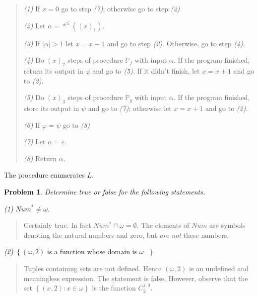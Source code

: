 \documentclass[a4paper, 12pt]{article}
\newtheorem{problem}{Problem}
\newtheorem{problem}{Problem}
\begin{document}
\begin{quote}
    \textit{(1)} If $x = 0$ go to step \textit{(7)}; otherwise go to step
    \textit{(2)}

    \textit{(2)} Let $\alpha = *^{\leq}\left( (x)_1 \right) $. 

    \textit{(3)} If $|\alpha| > 1$ let $x = x + 1$ and go to step \textit{(2)}.
    Otherwise, go to step \textit{(4)}. 

    \textit{(4)} Do $(x)_2$ steps of procedure $\mathbb{P}_f$ with input
    $\alpha$. If the program finished, return its output in $\varphi$ and go to
    \textit{(5)}. If it didn't finish, let $x = x + 1$ and go to \textit{(2)}.

    \textit{(5)} Do $(x)_3$ steps of procedure $\mathbb{P}_g$ with input
    $\alpha$. If the program finished, store its output in $\psi$ and go to
    \textit{(7)}; otherwise let
    $x = x + 1$ and go to \textit{(2)}.

    \textit{(6)} If $\varphi = \psi$ go to \textit{(8)}

    \textit{(7)} Let $\alpha = \varepsilon$. 

    \textit{(8)} Return $\alpha$.

\end{quote}

The procedure enumerates $L$.

\pagebreak 

\begin{problem}
    Determine true or false for the following statements.
\end{problem}

\textit{(1)} $Num^{*} \neq \omega$. 


\small
\begin{quote}

    Certainly true. In fact $Num^{*} \cap \omega = \emptyset$. The elements of
    $Num$ are symbols denoting the natural numbers and zero, but \textit{are
    not} these numbers.
\end{quote}
\normalsize


\textit{(2)} $\left\{ (\omega, 2) \text{ is a function whose domain is $\omega$ } \right\} $


\small
\begin{quote}

Tuples containing sets are not defined. Hence $(\omega, 2)$ is an undefined and
meaningless expression. The statement is false. However, observe that the set
$\left\{ (x, 2) : x \in \omega \right\} $ is the function $C_{2}^{1, 0}$.

\end{quote}
\normalsize
\end{document}
